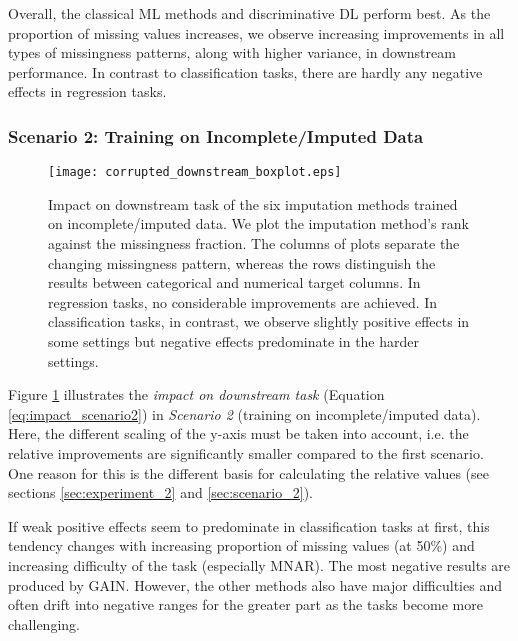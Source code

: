 Overall, the classical ML methods and discriminative DL perform best. As the proportion of missing values increases, we observe increasing improvements in all types of missingness patterns, along with higher variance, in downstream performance. In contrast to classification tasks, there are hardly any negative effects in regression tasks.

\subsubsection{Scenario 2: Training on Incomplete/Imputed Data}



\begin{figure}\centering
	\texttt{[image: corrupted\_downstream\_boxplot.eps]}

	\caption[Downstream Ranks - Corrupted]{Impact on downstream task of the six imputation methods trained on incomplete/imputed data. We plot the imputation method's rank against the missingness fraction. The columns of plots separate the changing missingness pattern, whereas the rows distinguish the results between categorical and numerical target columns. In regression tasks, no considerable improvements are achieved. In classification tasks, in contrast, we observe slightly positive effects in some settings but negative effects predominate in the harder settings.
    }
	\label{fig:corrupted_downstream_boxplot}
\end{figure}

Figure \ref{fig:corrupted_downstream_boxplot} illustrates the \textit{impact on downstream task} (Equation \ref{eq:impact_scenario2}) in \textit{Scenario 2} (training on incomplete/imputed data). Here, the different scaling of the y-axis must be taken into account, i.e. the relative improvements are significantly smaller compared to the first scenario. One reason for this is the different basis for calculating the relative values (see sections \autoref{sec:experiment_2} and \autoref{sec:scenario_2}).  

If weak positive effects seem to predominate in classification tasks at first, this tendency changes with increasing proportion of missing values (at 50\%) and increasing difficulty of the task (especially MNAR). The most negative results are produced by GAIN. However, the other methods also have major difficulties and often drift into negative ranges for the greater part as the tasks become more challenging.

